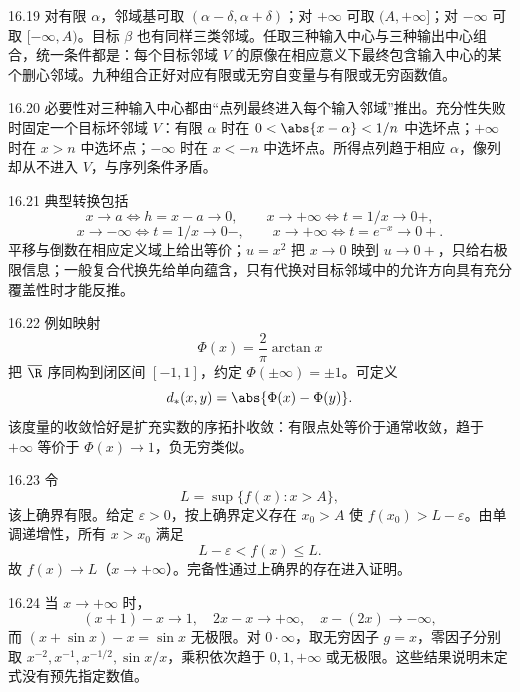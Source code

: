 \begin{solution}{16.19}
对有限 \(\alpha\)，邻域基可取 \((\alpha-\delta,\alpha+\delta)\)；对 \(+\infty\) 可取 \((A,+\infty]\)；对 \(-\infty\) 可取 \([-\infty,A)\)。目标 \(\beta\) 也有同样三类邻域。任取三种输入中心与三种输出中心组合，统一条件都是：每个目标邻域 \(V\) 的原像在相应意义下最终包含输入中心的某个删心邻域。九种组合正好对应有限或无穷自变量与有限或无穷函数值。
\end{solution}

\begin{solution}{16.20}
必要性对三种输入中心都由“点列最终进入每个输入邻域”推出。充分性失败时固定一个目标坏邻域 \(V\)：有限 \(\alpha\) 时在 \(0<\abs{x-\alpha}<1/n\) 中选坏点；\(+\infty\) 时在 \(x>n\) 中选坏点；\(-\infty\) 时在 \(x<-n\) 中选坏点。所得点列趋于相应 \(\alpha\)，像列却从不进入 \(V\)，与序列条件矛盾。
\end{solution}

\begin{solution}{16.21}
典型转换包括
\[
 x\to a\Longleftrightarrow h=x-a\to0,\qquad
 x\to+\infty\Longleftrightarrow t=1/x\to0+,
\]
\[
 x\to-\infty\Longleftrightarrow t=1/x\to0-,\qquad
 x\to+\infty\Longleftrightarrow t=e^{-x}\to0+.
\]
平移与倒数在相应定义域上给出等价；\(u=x^2\) 把 \(x\to0\) 映到 \(u\to0+\)，只给右极限信息；一般复合代换先给单向蕴含，只有代换对目标邻域中的允许方向具有充分覆盖性时才能反推。
\end{solution}

\begin{solution}{16.22}
例如映射
\[
 \Phi(x)=\frac2\pi\arctan x
\]
把 \(\overline{\R}\) 序同构到闭区间 \([-1,1]\)，约定 \(\Phi(\pm\infty)=\pm1\)。可定义
\[
 d_*(x,y)=\abs{\Phi(x)-\Phi(y)}.
\]
该度量的收敛恰好是扩充实数的序拓扑收敛：有限点处等价于通常收敛，趋于 \(+\infty\) 等价于 \(\Phi(x)\to1\)，负无穷类似。
\end{solution}

\begin{solution}{16.23}
令
\[
 L=\sup\{f(x):x>A\},
\]
该上确界有限。给定 \(\varepsilon>0\)，按上确界定义存在 \(x_0>A\) 使 \(f(x_0)>L-\varepsilon\)。由单调递增性，所有 \(x>x_0\) 满足
\[
 L-\varepsilon<f(x)\le L.
\]
故 \(f(x)\to L\)（\(x\to+\infty\)）。完备性通过上确界的存在进入证明。
\end{solution}

\begin{solution}{16.24}
当 \(x\to+\infty\) 时，
\[
 (x+1)-x\to1,\quad 2x-x\to+\infty,\quad
 x-(2x)\to-\infty,
\]
而 \((x+\sin x)-x=\sin x\) 无极限。对 \(0\cdot\infty\)，取无穷因子 \(g=x\)，零因子分别取 \(x^{-2},x^{-1},x^{-1/2},\sin x/x\)，乘积依次趋于 \(0,1,+\infty\) 或无极限。这些结果说明未定式没有预先指定数值。
\end{solution}
